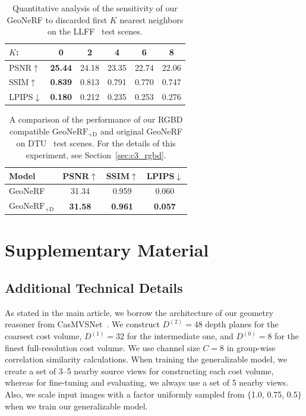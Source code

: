 \begin{table}[!t]
	\begin{center}
		\begin{tabular}{lccccc}
			\hline
			$K$: & 0 & 2 & 4 & 6 & 8\\
			\hline
			PSNR$\uparrow$ & \textbf{25.44} & 24.18 & 23.35 & 22.74 & 22.06 \\
			SSIM$\uparrow$ & \textbf{0.839} & 0.813 & 0.791 & 0.770 & 0.747 \\
			LPIPS$\downarrow$ & \textbf{0.180} & 0.212 & 0.235 & 0.253 & 0.276 \\
			\hline
		\end{tabular}
	\end{center}
	\caption{Quantitative analysis of the sensitivity of our GeoNeRF to discarded first $K$ nearest neighbors on the LLFF~\cite{mildenhall2019llff} test scenes.}
	\label{table:discard_views}
\end{table}

\begin{table}[!t]
\begin{center}
        \begin{tabular}{l|ccc}
        \hline
        Model & \small PSNR$\uparrow$ & \small SSIM$\uparrow$ & \small LPIPS$\downarrow$  \\
        \hline
        GeoNeRF & 31.34 & 0.959 & 0.060  \\
        $\text{GeoNeRF}_{\text{+D}}$  & \textbf{31.58} & \textbf{0.961} & \textbf{0.057} \\
        \hline
        \end{tabular}
    \end{center}
    \caption{A comparison of the performance of our RGBD compatible $\text{GeoNeRF}_{\text{+D}}$ and original GeoNeRF on DTU~\cite{jensen2014large} test scenes. For the details of this experiment, see Section~\ref{sec:c3_rgbd}.}
    \label{table:rgbd}
\end{table}

\FloatBarrier
\clearpage

\section{Supplementary Material}

\subsection{Additional Technical Details}

As stated in the main article, we borrow the architecture of our geometry reasoner from CasMVSNet~\cite{gu2020cascade}. We construct $D^{(2)} = 48$ depth planes for the coarsest cost volume, $D^{(1)} = 32$ for the intermediate one, and $D^{(0)} = 8$ for the finest full-resolution cost volume. We use channel size $C = 8$ in group-wise correlation similarity calculations. When training the generalizable model, we create a set of 3$\textrm{--}$5 nearby source views for constructing each cost volume, whereas for fine-tuning and evaluating, we always use a set of 5 nearby views. Also, we scale input images with a factor uniformly sampled from $\{$1.0, 0.75, 0.5$\}$ when we train our generalizable model.

